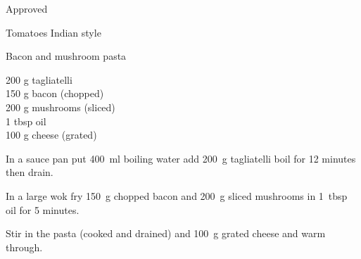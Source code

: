 \begin{menu}{Approved}
\begin{recipe}{2}{Tomatoes Indian style}
\begin{instructions}
    \end{instructions}
    \end{recipe}%
  
    \begin{recipe}{1}{Bacon and mushroom pasta}%
    
		\begin{ingredients}
		200 g tagliatelli  \\
	150 g bacon (chopped) \\
	200 g mushrooms (sliced) \\
	1 tbsp oil  \\
	100 g cheese (grated) \\
	
		\end{ingredients}
	
    \begin{instructions}
    \item 
      In a
      sauce pan
      put
      400~ml  boiling water
      add
      200~g  tagliatelli
      boil for 12 minutes then drain.
    \item 
        In a large wok fry 150~g chopped bacon
        and
        200~g sliced mushrooms
        in
        1~tbsp  oil for 5 minutes.
      \item 
        Stir in the pasta (cooked and drained)
        and 100~g grated cheese
        and warm through.
      
    \end{instructions}
    \end{recipe}%
  
    \clearpage
    \end{menu}
	
